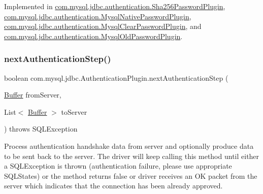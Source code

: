 Implemented in \mbox{\hyperlink{classcom_1_1mysql_1_1jdbc_1_1authentication_1_1_sha256_password_plugin_acd2909ff9faf158cd5cd6bf14851dddc}{com.\+mysql.\+jdbc.\+authentication.\+Sha256\+Password\+Plugin}}, \mbox{\hyperlink{classcom_1_1mysql_1_1jdbc_1_1authentication_1_1_mysql_native_password_plugin_aa11ae323c22a910cd0cd6a1e904ff458}{com.\+mysql.\+jdbc.\+authentication.\+Mysql\+Native\+Password\+Plugin}}, \mbox{\hyperlink{classcom_1_1mysql_1_1jdbc_1_1authentication_1_1_mysql_clear_password_plugin_aa780df1f828468540fcb6f54fac0d5e3}{com.\+mysql.\+jdbc.\+authentication.\+Mysql\+Clear\+Password\+Plugin}}, and \mbox{\hyperlink{classcom_1_1mysql_1_1jdbc_1_1authentication_1_1_mysql_old_password_plugin_a66202ca57be0da786649bf07b3ea75d2}{com.\+mysql.\+jdbc.\+authentication.\+Mysql\+Old\+Password\+Plugin}}.

\mbox{\label{interfacecom_1_1mysql_1_1jdbc_1_1_authentication_plugin_a1ed9558616b029386dc24bcade409f3d}} 
\subsubsection{\texorpdfstring{next\+Authentication\+Step()}{nextAuthenticationStep()}}
{\footnotesize\ttfamily boolean com.\+mysql.\+jdbc.\+Authentication\+Plugin.\+next\+Authentication\+Step (\begin{DoxyParamCaption}\item[{\mbox{\hyperlink{classcom_1_1mysql_1_1jdbc_1_1_buffer}{Buffer}}}]{from\+Server,  }\item[{List$<$ \mbox{\hyperlink{classcom_1_1mysql_1_1jdbc_1_1_buffer}{Buffer}} $>$}]{to\+Server }\end{DoxyParamCaption}) throws S\+Q\+L\+Exception}

Process authentication handshake data from server and optionally produce data to be sent back to the server. The driver will keep calling this method until either a S\+Q\+L\+Exception is thrown (authentication failure, please use appropriate S\+Q\+L\+States) or the method returns false or driver receives an OK packet from the server which indicates that the connection has been already approved.

